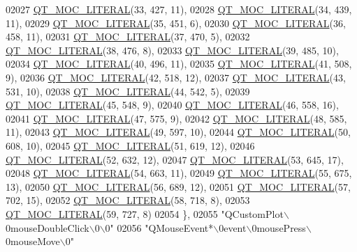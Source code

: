 \begin{DoxyCode}
02027 \hyperlink{a00067_a75bb9482d242cde0a06c9dbdc6b83abe}{QT\_MOC\_LITERAL}(33, 427, 11),
02028 \hyperlink{a00067_a75bb9482d242cde0a06c9dbdc6b83abe}{QT\_MOC\_LITERAL}(34, 439, 11),
02029 \hyperlink{a00067_a75bb9482d242cde0a06c9dbdc6b83abe}{QT\_MOC\_LITERAL}(35, 451, 6),
02030 \hyperlink{a00067_a75bb9482d242cde0a06c9dbdc6b83abe}{QT\_MOC\_LITERAL}(36, 458, 11),
02031 \hyperlink{a00067_a75bb9482d242cde0a06c9dbdc6b83abe}{QT\_MOC\_LITERAL}(37, 470, 5),
02032 \hyperlink{a00067_a75bb9482d242cde0a06c9dbdc6b83abe}{QT\_MOC\_LITERAL}(38, 476, 8),
02033 \hyperlink{a00067_a75bb9482d242cde0a06c9dbdc6b83abe}{QT\_MOC\_LITERAL}(39, 485, 10),
02034 \hyperlink{a00067_a75bb9482d242cde0a06c9dbdc6b83abe}{QT\_MOC\_LITERAL}(40, 496, 11),
02035 \hyperlink{a00067_a75bb9482d242cde0a06c9dbdc6b83abe}{QT\_MOC\_LITERAL}(41, 508, 9),
02036 \hyperlink{a00067_a75bb9482d242cde0a06c9dbdc6b83abe}{QT\_MOC\_LITERAL}(42, 518, 12),
02037 \hyperlink{a00067_a75bb9482d242cde0a06c9dbdc6b83abe}{QT\_MOC\_LITERAL}(43, 531, 10),
02038 \hyperlink{a00067_a75bb9482d242cde0a06c9dbdc6b83abe}{QT\_MOC\_LITERAL}(44, 542, 5),
02039 \hyperlink{a00067_a75bb9482d242cde0a06c9dbdc6b83abe}{QT\_MOC\_LITERAL}(45, 548, 9),
02040 \hyperlink{a00067_a75bb9482d242cde0a06c9dbdc6b83abe}{QT\_MOC\_LITERAL}(46, 558, 16),
02041 \hyperlink{a00067_a75bb9482d242cde0a06c9dbdc6b83abe}{QT\_MOC\_LITERAL}(47, 575, 9),
02042 \hyperlink{a00067_a75bb9482d242cde0a06c9dbdc6b83abe}{QT\_MOC\_LITERAL}(48, 585, 11),
02043 \hyperlink{a00067_a75bb9482d242cde0a06c9dbdc6b83abe}{QT\_MOC\_LITERAL}(49, 597, 10),
02044 \hyperlink{a00067_a75bb9482d242cde0a06c9dbdc6b83abe}{QT\_MOC\_LITERAL}(50, 608, 10),
02045 \hyperlink{a00067_a75bb9482d242cde0a06c9dbdc6b83abe}{QT\_MOC\_LITERAL}(51, 619, 12),
02046 \hyperlink{a00067_a75bb9482d242cde0a06c9dbdc6b83abe}{QT\_MOC\_LITERAL}(52, 632, 12),
02047 \hyperlink{a00067_a75bb9482d242cde0a06c9dbdc6b83abe}{QT\_MOC\_LITERAL}(53, 645, 17),
02048 \hyperlink{a00067_a75bb9482d242cde0a06c9dbdc6b83abe}{QT\_MOC\_LITERAL}(54, 663, 11),
02049 \hyperlink{a00067_a75bb9482d242cde0a06c9dbdc6b83abe}{QT\_MOC\_LITERAL}(55, 675, 13),
02050 \hyperlink{a00067_a75bb9482d242cde0a06c9dbdc6b83abe}{QT\_MOC\_LITERAL}(56, 689, 12),
02051 \hyperlink{a00067_a75bb9482d242cde0a06c9dbdc6b83abe}{QT\_MOC\_LITERAL}(57, 702, 15),
02052 \hyperlink{a00067_a75bb9482d242cde0a06c9dbdc6b83abe}{QT\_MOC\_LITERAL}(58, 718, 8),
02053 \hyperlink{a00067_a75bb9482d242cde0a06c9dbdc6b83abe}{QT\_MOC\_LITERAL}(59, 727, 8)
02054     \},
02055     \textcolor{stringliteral}{"QCustomPlot\(\backslash\)0mouseDoubleClick\(\backslash\)0\(\backslash\)0"}
02056     \textcolor{stringliteral}{"QMouseEvent*\(\backslash\)0event\(\backslash\)0mousePress\(\backslash\)0mouseMove\(\backslash\)0"}

\end{DoxyCode}
